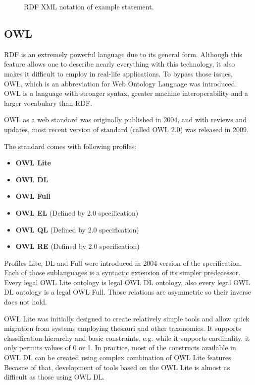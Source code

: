 \begin{figure}[ht]
	\centering
	
	\caption{RDF XML notation of example statement.}
	\label{fig:sample_rdf_xml}
\end{figure}

\subsection{OWL}

RDF is an extremely powerful language due to its general form. Although this feature allows one to describe nearly everything with this technology, it also makes it difficult to employ in real-life applications. To bypass those issues, OWL, which is an abbreviation for Web Ontology Language was introduced. OWL is a language with stronger syntax, greater machine interoperability and a larger vocabulary than RDF.

OWL as a web standard was originally published in 2004, and with reviews and updates, most recent version of standard (called OWL 2.0) was released in 2009\cite{owlRef:2009, owlPrimer:2009}.

The standard comes with following profiles:

\begin{itemize}
	\item{ {\bf OWL Lite}}
	\item{ {\bf OWL DL}}
	\item{ {\bf OWL Full}}
	\item{ {\bf OWL EL} (Defined by 2.0 specification)}
	\item{ {\bf OWL QL} (Defined by 2.0 specification)}
	\item{ {\bf OWL RE} (Defined by 2.0 specification)}
\end{itemize}

Profiles Lite, DL and Full were introduced in 2004 version of the specification. Each of those sublanguages is a syntactic extension of its simpler predecessor. Every legal OWL Lite ontology is legal OWL DL ontology, also every legal OWL DL ontology is a legal OWL Full. Those relations are asymmetric so their inverse does not hold.

OWL Lite was initially designed to create relatively simple tools and allow quick migration from systems employing thesauri and other taxonomies. It supports classification hierarchy and basic constraints, e.g. while it supports cardinality, it only permits values of 0 or 1. In practice, most of the constructs available in OWL DL can be created using complex combination of OWL Lite features Becasue of that, development of tools based on the OWL Lite is almost as difficult as those using OWL DL.

